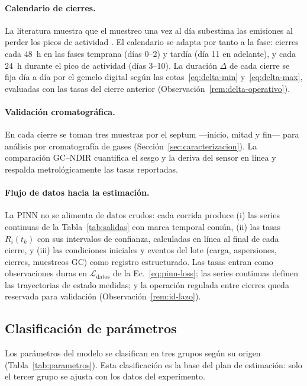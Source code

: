 \paragraph{Calendario de cierres.}
La literatura muestra que el muestreo una vez al día subestima las emisiones
al perder los picos de actividad
\citep{parodiBioconversionEfficienciesGreenhouse2020a}. El calendario se
adapta por tanto a la fase: cierres cada $48$~h en las fases temprana
(días 0--2) y tardía (día 11 en adelante), y cada $24$~h durante el pico de
actividad (días 3--10). La duración $\Delta$ de cada cierre se fija día a día
por el gemelo digital según las cotas~\eqref{eq:delta-min}
y~\eqref{eq:delta-max}, evaluadas con las tasas del cierre anterior
(Observación~\ref{rem:delta-operativo}).

\paragraph{Validación cromatográfica.}
En cada cierre se toman tres muestras por el septum ---inicio, mitad y
fin--- para análisis por cromatografía de gases
(Sección~\ref{sec:caracterizacion}). La comparación GC--NDIR cuantifica el
sesgo y la deriva del sensor en línea y respalda metrológicamente las tasas
reportadas.

\paragraph{Flujo de datos hacia la estimación.}
La PINN no se alimenta de datos crudos: cada corrida produce (i) las series
continuas de la Tabla~\ref{tab:salidas} con marca temporal común, (ii) las
tasas $R_i(t_k)$ con sus intervalos de confianza, calculadas en línea al
final de cada cierre, y (iii) las condiciones iniciales y eventos del lote
(carga, aspersiones, cierres, muestreos GC) como registro estructurado. Las
tasas entran como observaciones duras en $\mathcal{L}_{\mathrm{datos}}$ de la
Ec.~\eqref{eq:pinn-loss}; las series continuas definen las trayectorias de
estado medidas; y la operación regulada entre cierres queda reservada para
validación (Observación~\ref{rem:id-lazo}).

\subsection{Clasificación de parámetros}\label{sec:clasificacion-parametros}

Los parámetros del modelo se clasifican en tres grupos según su origen
(Tabla~\ref{tab:parametros}). Esta clasificación es la base del plan de
estimación: solo el tercer grupo se ajusta con los datos del experimento.

